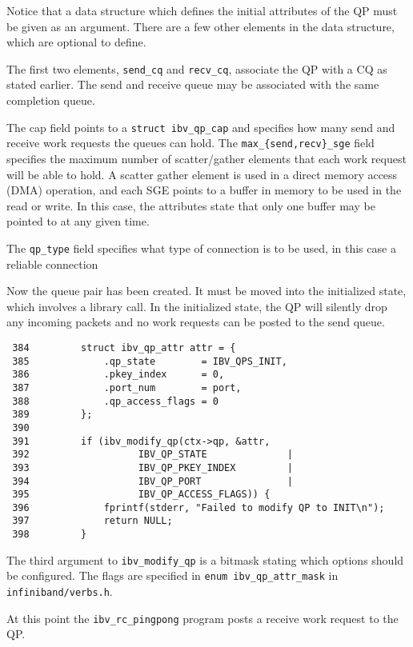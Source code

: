 \documentclass[letterpaper,12pt]{article}
\begin{document}
Notice that a data structure which defines the initial attributes of the
QP must be given as an argument.  There are a few other elements in the
data structure, which are optional to define.

The first two elements, {\tt send\_cq} and {\tt recv\_cq},
 associate the QP with a CQ as stated earlier. The
send and receive queue may be associated with the same completion queue.

The cap field points to a {\tt struct ibv\_qp\_cap} and specifies how many send
and receive work requests the queues can hold. The {\tt max\_\{send,recv\}\_sge}
field specifies the maximum number of scatter/gather elements that each work
request will be able to hold. A scatter gather element is used in a direct
memory access (DMA) operation, and each SGE points to a buffer
in memory to be used in the read or write. In this case, the attributes
state that only one buffer may be pointed to at any given time.

The {\tt qp\_type} field specifies what type of connection is to be used,
in this case a reliable connection

Now the queue pair has been created. It must be moved into the
initialized state, which involves a library call. In the initialized
state, the QP will silently drop~\cite[Page~460]{spec} any incoming packets and no work
requests can be posted to the send queue.

\lstset{language=C, caption=Setting QP to INIT}
\begin{lstlisting}
 384         struct ibv_qp_attr attr = {
 385             .qp_state        = IBV_QPS_INIT,
 386             .pkey_index      = 0,
 387             .port_num        = port,
 388             .qp_access_flags = 0
 389         };
 390
 391         if (ibv_modify_qp(ctx->qp, &attr,
 392                   IBV_QP_STATE              |
 393                   IBV_QP_PKEY_INDEX         |
 394                   IBV_QP_PORT               |
 395                   IBV_QP_ACCESS_FLAGS)) {
 396             fprintf(stderr, "Failed to modify QP to INIT\n");
 397             return NULL;
 398         }
\end{lstlisting}

The third argument to {\tt ibv\_modify\_qp} is a bitmask stating which options
should be configured. The flags are specified in {\tt enum ibv\_qp\_attr\_mask}
in {\tt infiniband/verbs.h}.

At this point the {\tt ibv\_rc\_pingpong} program posts a receive work request to the QP.
\end{document}
